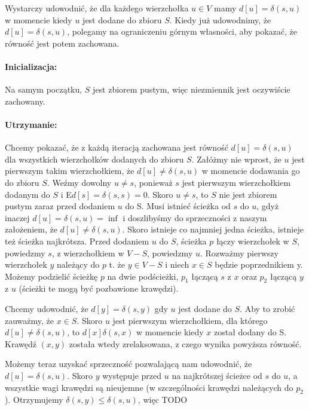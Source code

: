 Wystarczy udowodnić, że dla każdego wierzchołka $u \in V$ mamy $d[u] = \delta(s, u)$ w momencie
kiedy $u$ jest dodane do zbioru $S$. Kiedy już udowodnimy, że $d[u] = \delta(s, u)$,
polegamy na ograniczeniu górnym własności, aby pokazać, że równość jest potem zachowana.

\paragraph{Inicializacja:} Na samym początku, $S$ jest zbiorem pustym, więc niezmiennik jest oczywiście
zachowany.

\paragraph{Utrzymanie:} Chcemy pokazać, że z każdą iteracją zachowana jest równość $d[u] = \delta(s, u)$
dla wszystkich wierzchołków dodanych do zbioru $S$.
Załóżmy nie wprost, że $u$ jest pierwszym takim wierzchołkiem, że $d[u] \ne \delta(s,u)$ w momencie dodawania go do zbioru $S$.
Weźmy dowolny $u \ne s$, ponieważ  $s$ jest pierwszym wierzchołkiem dodanym do $S$ i E$d[s] = \delta(s,s) = 0$.
Skoro $u \ne s$, to $S$ nie jest zbiorem pustym zaraz przed dodaniem $u$ do S.
Musi istnieć ścieżka od $s$ do $u$, gdyż inaczej $d[u] = \delta(s,u) = \inf$ i doszlibyśmy do sprzeczności z naszym założeniem, że $d[u] \ne \delta(s, u)$.
Skoro istnieje co najmniej jedna ścieżka, istnieje też ścieżka najkrótsza.
Przed dodaniem $u$ do $S$, ścieżka $p$ łączy wierzchołek w $S$, powiedzmy $s$, z wierzchołkiem w $V - S$, powiedzmy $u$.
Rozważmy pierwszy wierzchołek $y$ należący do $p$ t. że $y \in V - S$ i niech $x \in S$ będzie poprzednikiem y.
Możemy podzielić ścieżkę $p$ na dwie podścieżki, $p_1$ łączącą $s$ z $x$ oraz $p_2$ łączącą $y$ z $u$ (ścieżki te mogą być pozbawione krawędzi).

Chcemy udowodnić, że $d[y] = \delta(s,y)$ gdy $u$ jest dodane do $S$.
Aby to zrobić zauważmy, że $x \in S$.
Skoro $u$ jest pierwszym wierzchołkiem, dla którego $d[u] \ne \delta(s,u)$, to $d[x] \delta(s,x)$ w momencie kiedy $x$ został dodany do S.
Krawędź $(x, y)$ została wtedy zrelaksowana, z czego wynika powyższa równość.

Możemy teraz uzyskać sprzeczność pozwalającą nam udowodnić, że $d[u] = \delta(s,u)$.
Skoro $y$ występuje przed $u$ na najkrótszej ścieżce od $s$ do $u$, a wszystkie
wagi krawędzi są nieujemne (w szczególności krawędzi należących do $p_2$). Otrzymujemy
$\delta(s, y) \le \delta(s, u)$, więc
TODO

